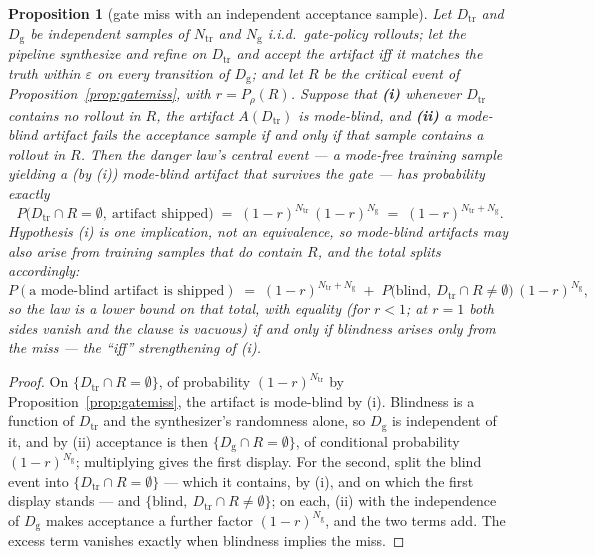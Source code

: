 \documentclass[11pt]{article}
\newtheorem{proposition}{Proposition}
\theoremstyle{definition}
\theoremstyle{remark}
\begin{document}
\begin{proposition}[gate miss with an independent acceptance sample]
\label{prop:twofactor}
Let $D_{\mathrm{tr}}$ and $D_{\mathrm{g}}$ be independent samples of $N_{\mathrm{tr}}$ and $N_{\mathrm{g}}$ i.i.d.\ gate-policy rollouts; let the pipeline synthesize and refine on $D_{\mathrm{tr}}$ and accept the artifact iff it matches the truth within $\varepsilon$ on every transition of $D_{\mathrm{g}}$; and let $R$ be the critical event of Proposition~\ref{prop:gatemiss}, with $r = P_\rho(R)$. Suppose that \textbf{(i)} whenever $D_{\mathrm{tr}}$ contains no rollout in $R$, the artifact $A(D_{\mathrm{tr}})$ is mode-blind, and \textbf{(ii)} a mode-blind artifact fails the acceptance sample if and only if that sample contains a rollout in $R$. Then the danger law's central event --- a mode-free training sample yielding a (by (i)) mode-blind artifact that survives the gate --- has probability exactly
\[
  P\bigl(D_{\mathrm{tr}} \cap R = \emptyset,\ \text{artifact shipped}\bigr) \;=\; (1-r)^{N_{\mathrm{tr}}}\,(1-r)^{N_{\mathrm{g}}} \;=\; (1-r)^{N_{\mathrm{tr}} + N_{\mathrm{g}}} .
\]
Hypothesis (i) is one implication, not an equivalence, so mode-blind artifacts may also arise from training samples that \emph{do} contain $R$, and the total splits accordingly:
\[
  P(\text{a mode-blind artifact is shipped}) \;=\; (1-r)^{N_{\mathrm{tr}} + N_{\mathrm{g}}} \;+\; P\bigl(\text{blind},\ D_{\mathrm{tr}} \cap R \neq \emptyset\bigr)\,(1-r)^{N_{\mathrm{g}}},
\]
so the law is a lower bound on that total, with equality (for $r < 1$; at $r = 1$ both sides vanish and the clause is vacuous) if and only if blindness arises only from the miss --- the ``iff'' strengthening of (i).
\end{proposition}

\begin{proof}
On $\{D_{\mathrm{tr}} \cap R = \emptyset\}$, of probability $(1-r)^{N_{\mathrm{tr}}}$ by Proposition~\ref{prop:gatemiss}, the artifact is mode-blind by (i). Blindness is a function of $D_{\mathrm{tr}}$ and the synthesizer's randomness alone, so $D_{\mathrm{g}}$ is independent of it, and by (ii) acceptance is then $\{D_{\mathrm{g}} \cap R = \emptyset\}$, of conditional probability $(1-r)^{N_{\mathrm{g}}}$; multiplying gives the first display. For the second, split the blind event into $\{D_{\mathrm{tr}} \cap R = \emptyset\}$ --- which it contains, by (i), and on which the first display stands --- and $\{\text{blind},\ D_{\mathrm{tr}} \cap R \neq \emptyset\}$; on each, (ii) with the independence of $D_{\mathrm{g}}$ makes acceptance a further factor $(1-r)^{N_{\mathrm{g}}}$, and the two terms add. The excess term vanishes exactly when blindness implies the miss.
\end{proof}
\end{document}
